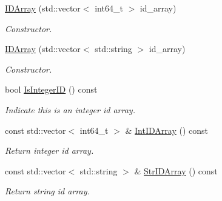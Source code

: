 \begin{DoxyCompactItemize}
\item 
\mbox{\label{classmilvus_1_1_i_d_array_a5d5a850bacaf849900b438754cf28aa3}} 
\hyperlink{classmilvus_1_1_i_d_array_a5d5a850bacaf849900b438754cf28aa3}{I\+D\+Array} (std\+::vector$<$ int64\+\_\+t $>$ id\+\_\+array)
\begin{DoxyCompactList}\small\item\em Constructor. \end{DoxyCompactList}\item 
\mbox{\label{classmilvus_1_1_i_d_array_aebe3973775146591db1c090a61067869}} 
\hyperlink{classmilvus_1_1_i_d_array_aebe3973775146591db1c090a61067869}{I\+D\+Array} (std\+::vector$<$ std\+::string $>$ id\+\_\+array)
\begin{DoxyCompactList}\small\item\em Constructor. \end{DoxyCompactList}\item 
\mbox{\label{classmilvus_1_1_i_d_array_af3ced4d9198e365a01855c35ca278433}} 
bool \hyperlink{classmilvus_1_1_i_d_array_af3ced4d9198e365a01855c35ca278433}{Is\+Integer\+ID} () const
\begin{DoxyCompactList}\small\item\em Indicate this is an integer id array. \end{DoxyCompactList}\item 
\mbox{\label{classmilvus_1_1_i_d_array_a6167808a8cbcfe5abc0e72a7e39feaa3}} 
const std\+::vector$<$ int64\+\_\+t $>$ \& \hyperlink{classmilvus_1_1_i_d_array_a6167808a8cbcfe5abc0e72a7e39feaa3}{Int\+I\+D\+Array} () const
\begin{DoxyCompactList}\small\item\em Return integer id array. \end{DoxyCompactList}\item 
\mbox{\label{classmilvus_1_1_i_d_array_a3ceffb160eed81f5220dc8c3014704ab}} 
const std\+::vector$<$ std\+::string $>$ \& \hyperlink{classmilvus_1_1_i_d_array_a3ceffb160eed81f5220dc8c3014704ab}{Str\+I\+D\+Array} () const
\begin{DoxyCompactList}\small\item\em Return string id array. \end{DoxyCompactList}\end{DoxyCompactItemize}


